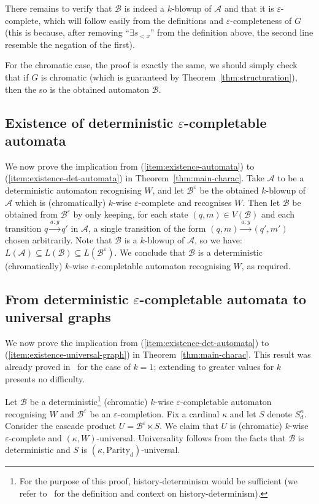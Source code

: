 \documentclass[a4paper,UKenglish,cleveref, thm-restate]{lipics-v2021}
\newcommand{\re}[1]{\xrightarrow{#1}}
\newcommand{\Parity}{\mathrm{Parity}}
\newcommand{\eps}{\varepsilon}
\newcommand{\A}{\mathcal{A}}
\newcommand{\casc}{\ltimes}
\newcommand{\B}{\mathcal B}
\begin{document}
There remains to verify that $\B$ is indeed a $k$-blowup of $\A$ and that it is $\eps$-complete, which will follow easily from the definitions and $\eps$-completeness of $G$ (this is because, after removing ``$\exists s_{<x}$'' from the definition above, the second line resemble the negation of the first).

For the chromatic case, the proof is exactly the same, we should simply check that if $G$ is chromatic (which is guaranteed by Theorem~\ref{thm:structuration}), then the so is the obtained automaton $\B$.

\subsection{Existence of deterministic $\eps$-completable automata}\label{sec:existence-det-automata}

We now prove the implication from (\ref{item:existence-automata}) to (\ref{item:existence-det-automata}) in Theorem~\ref{thm:main-charac}.
Take $\A$ to be a deterministic automaton recognising $W$, and let $\B^\eps$ be the obtained $k$-blowup of $\A$ which is (chromatically) $k$-wise $\eps$-complete and recognises $W$.
Then let $\B$ be obtained from $\B^\eps$ by only keeping, for each state $(q,m) \in V(\B)$ and each transition $q \re{a:y} q'$ in $\A$, a single transition of the form $(q,m) \re {a:y} (q',m')$ chosen arbitrarily.
Note that $\B$ is a $k$-blowup of $\A$, so we have: $L(\A) \subseteq L(\B) \subseteq L(\B^\eps)$.
We conclude that $\B$ is a deterministic (chromatically) $k$-wise $\eps$-completable automaton recognising $W$, as required.


\subsection{From deterministic $\eps$-completable automata to universal graphs}\label{sec:existence-universal-graphs}

We now prove the implication from (\ref{item:existence-det-automata}) to (\ref{item:existence-universal-graph}) in Theorem~\ref{thm:main-charac}.
This result was already proved in~\cite[Prop.~5.30]{CO24Arxiv} for the case of $k=1$; extending to greater values for $k$ presents no difficulty.

Let $\B$ be a deterministic\footnote{For the purpose of this proof, history-determinism would be sufficient (we refer to~\cite{BL23SurveyHD} for the definition and context on history-determinism).} (chromatic) $k$-wise $\eps$-completable automaton recognising $W$ and $\B^\eps$ be an $\eps$-completion.
Fix a cardinal $\kappa$ and let $S$ denote $S_d^\kappa$.
Consider the cascade product $U = \B^\eps \casc S$.
We claim that $U$ is (chromatic) $k$-wise $\eps$-complete and $(\kappa,W)$-universal.
Universality follows from the facts that $\B$ is deterministic and $S$ is $(\kappa,\Parity_d)$-universal.
\end{document}

